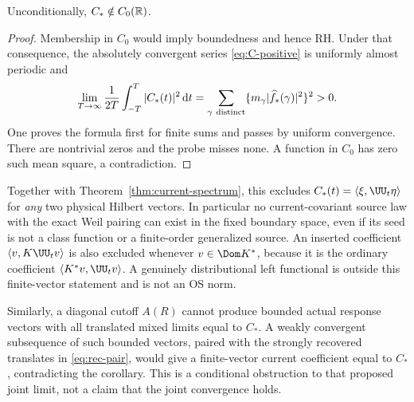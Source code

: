 \begin{corollary}\label{cor:nondecay}
Unconditionally, $C_*\notin C_0(\mathbb R)$.
\end{corollary}
\begin{proof}
Membership in $C_0$ would imply boundedness and hence RH.
Under that consequence, the absolutely convergent series
\eqref{eq:C-positive} is uniformly almost periodic and
\[
\lim_{T\to\infty}\frac1{2T}\int_{-T}^T|C_*(t)|^2\,\mathrm d t
=\sum_{\gamma\ {\rm distinct}}
\{m_\gamma|\widehat f_*(\gamma)|^2\}^2>0.
\]
One proves the formula first for finite sums and passes
by uniform convergence. There are nontrivial zeros and
the probe misses none. A function in $C_0$ has zero such
mean square, a contradiction.
\end{proof}
Together with Theorem~\ref{thm:current-spectrum}, this
excludes $C_*(t)=\ip\xi{\UU_t\eta}$ for \emph{any} two
physical Hilbert vectors. In particular no current-covariant
source law with the exact Weil pairing can exist in the
fixed boundary space, even if its seed is not a class
function or a finite-order generalized source.
An inserted coefficient $\ip v{K\UU_tv}$ is also excluded
whenever $v\in\Dom K^*$, because it is the ordinary
coefficient $\ip{K^*v}{\UU_tv}$.
A genuinely distributional left functional is outside
this finite-vector statement and is not an OS norm.

Similarly, a diagonal cutoff $A(R)$ cannot produce
bounded actual response vectors with all translated
mixed limits equal to $C_*$. A weakly convergent
subsequence of such bounded vectors, paired with the
strongly recovered translates in \eqref{eq:rec-pair},
would give a finite-vector current coefficient equal
to $C_*$, contradicting the corollary. This is a
conditional obstruction to that proposed joint limit,
not a claim that the joint convergence holds.

